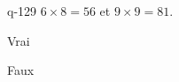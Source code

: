 \begin{truefalse}{q-129}
$6\times 8 = 56$ et $9\times 9 = 81$.
\item Vrai
\item* Faux
\end{truefalse}

